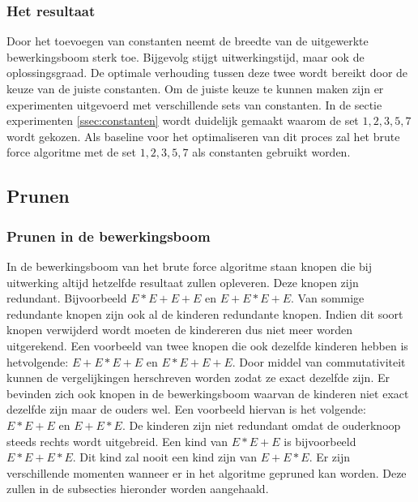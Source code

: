 \documentclass[Main.tex]{subfiles}
\begin{document}
\subsubsection*{Het resultaat}
Door het toevoegen van constanten neemt de breedte van de uitgewerkte bewerkingsboom sterk toe. Bijgevolg stijgt uitwerkingstijd, maar ook de oplossingsgraad. De optimale verhouding tussen deze twee wordt bereikt door de keuze van de juiste constanten. Om de juiste keuze te kunnen maken zijn er experimenten uitgevoerd met verschillende sets van constanten. In de sectie experimenten \ref{ssec:constanten}
wordt duidelijk gemaakt waarom de set ${1, 2, 3, 5, 7}$ wordt gekozen. Als baseline voor het optimaliseren van dit proces zal het brute force algoritme met de set ${1, 2, 3, 5, 7}$ als constanten gebruikt worden.

\subsection{Prunen} \label{ssec:Prunen}
\subsubsection*{Prunen in de bewerkingsboom}
In de bewerkingsboom van het brute force algoritme staan knopen die bij uitwerking altijd hetzelfde resultaat zullen opleveren. Deze knopen zijn redundant. Bijvoorbeeld $E \ast E+E+E$ en $E+E \ast E +E$. Van sommige redundante knopen zijn ook al de kinderen redundante knopen. Indien dit soort knopen verwijderd wordt moeten de kindereren dus niet meer worden uitgerekend. Een voorbeeld van twee knopen die ook dezelfde kinderen hebben is hetvolgende: $E+E \ast E+E$ en $E \ast E+E+E$. Door middel van commutativiteit kunnen de vergelijkingen herschreven worden zodat ze exact dezelfde zijn. Er bevinden zich ook knopen in de bewerkingsboom waarvan de kinderen niet exact dezelfde zijn maar de ouders wel. Een voorbeeld hiervan is het volgende: $E \ast E+E$ en $E+E \ast E$. De kinderen zijn niet redundant omdat de ouderknoop steeds rechts wordt uitgebreid. Een kind van $E \ast E+E$ is bijvoorbeeld $E \ast E+E \ast E$. Dit kind zal nooit een kind zijn van $E+E \ast E$. Er zijn verschillende momenten wanneer er in het algoritme gepruned kan worden. Deze zullen in de subsecties hieronder worden aangehaald.
\end{document}
